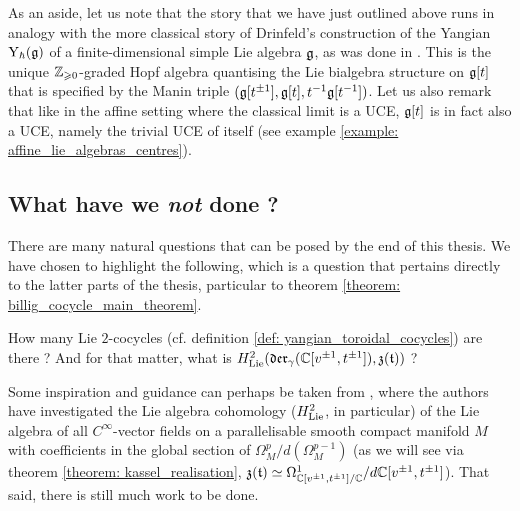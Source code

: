         As an aside, let us note that the story that we have just outlined above runs in analogy with the more classical story of Drinfeld's construction of the Yangian $\mathrm{Y}_{\hbar}(\mathfrak{g})$ of a finite-dimensional simple Lie algebra $\mathfrak{g}$, as was done in \cite{drinfeld_original_yangian_paper}. This is the unique $\mathbb{Z}_{\geqslant 0}$-graded Hopf algebra quantising the Lie bialgebra structure on $\mathfrak{g}[t]$ that is specified by the Manin triple $(\mathfrak{g}[t^{\pm 1}], \mathfrak{g}[t], t^{-1}\mathfrak{g}[t^{-1}])$. Let us also remark that like in the affine setting where the classical limit is a UCE, $\mathfrak{g}[t]$ is in fact also a UCE, namely the trivial UCE of itself (see example \ref{example: affine_lie_algebras_centres}).

    \subsection{What have we \textit{not} done ?}
        There are many natural questions that can be posed by the end of this thesis. We have chosen to highlight the following, which is a question that pertains directly to the latter parts of the thesis, particular to theorem \ref{theorem: billig_cocycle_main_theorem}.
        \begin{question}
            How many  Lie $2$-cocycles (cf. definition \ref{def: yangian_toroidal_cocycles}) are there ? And for that matter, what is $H^2_{\mathrm{Lie}}(\mathfrak{der}_{\gamma}(\mathbb{C}[v^{\pm 1}, t^{\pm 1}]), \mathfrak{z}(\mathfrak{t}))$ ?
        \end{question}
        Some inspiration and guidance can perhaps be taken from \cite{billig_neeb_vector_field_cyclic_cohomology_parallelisable_manifolds}, where the authors have investigated the Lie algebra cohomology ($H^2_{\mathrm{Lie}}$, in particular) of the Lie algebra of all $C^{\infty}$-vector fields on a parallelisable smooth compact manifold $M$ with coefficients in the global section of $\Omega^p_M/d( \Omega^{p - 1}_M )$ (as we will see via theorem \ref{theorem: kassel_realisation}, $\mathfrak{z}(\mathfrak{t}) \simeq \Omega^1_{ \mathbb{C}[v^{\pm 1}, t^{\pm 1}]/\mathbb{C} }/d \mathbb{C}[v^{\pm 1}, t^{\pm 1}]$). That said, there is still much work to be done.


